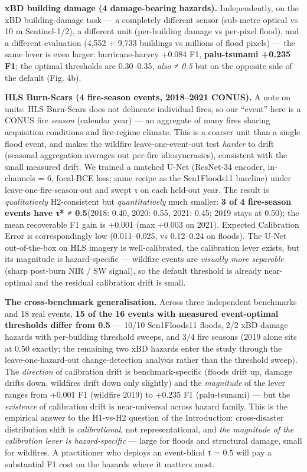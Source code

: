 \textbf{xBD building damage (4 damage-bearing hazards).} Independently, on the
xBD building-damage task --- a completely different sensor (sub-metre optical
vs 10 m Sentinel-1/2), a different unit (per-building damage vs per-pixel
flood), and a different evaluation (4,552 + 9,733 buildings vs millions of
flood pixels) --- the same lever is even larger: hurricane-harvey +0.084 F1,
\textbf{palu-tsunami +0.235 F1}; the optimal thresholds are 0.30--0.35, \emph{also
≠ 0.5} but on the opposite side of the default (Fig. 4b).

\textbf{HLS Burn-Scars (4 fire-season events, 2018--2021 CONUS).} A note on
units: HLS Burn-Scars does not delineate individual fires, so our
``event'' here is a CONUS fire \emph{season} (calendar year) --- an aggregate of
many fires sharing acquisition conditions and fire-regime climate. This
is a coarser unit than a single flood event, and makes the wildfire
leave-one-event-out test \emph{harder} to drift (seasonal aggregation
averages out per-fire idiosyncrasies), consistent with the small
measured drift. We trained a
matched U-Net (ResNet-34 encoder, in-channels = 6, focal-BCE loss; same
recipe as the Sen1Floods11 baseline) under leave-one-fire-season-out and
swept τ on each held-out year. The result is \emph{qualitatively} H2-consistent
but \emph{quantitatively} much smaller: \textbf{3 of 4 fire-season events have
τ* ≠ 0.5}(2018: 0.40, 2020: 0.55, 2021: 0.45; 2019 stays at 0.50);
the mean recoverable F1 gain is +0.001 (max +0.003 on 2021). Expected
Calibration Error is correspondingly low (0.011--0.025, vs 0.12--0.24 on
floods). The U-Net out-of-the-box on HLS imagery is well-calibrated, the
calibration lever exists, but its magnitude is hazard-specific --- wildfire
events are \emph{visually more separable} (sharp post-burn NIR / SW signal),
so the default threshold is already near-optimal and the residual
calibration drift is small.

\textbf{The cross-benchmark generalisation.} Across three independent
benchmarks and 18 real events, \textbf{15 of the 16 events with measured
event-optimal thresholds differ from 0.5} --- 10/10 Sen1Floods11 floods,
2/2 xBD damage hazards with per-building threshold sweeps, and 3/4 fire
seasons (2019 alone sits at 0.50 exactly; the remaining two xBD hazards
enter the study through the leave-one-hazard-out change-detection
analysis rather than the threshold sweep).
The \emph{direction} of calibration drift is benchmark-specific (floods drift
up, damage drifts down, wildfires drift down only slightly) and the
\emph{magnitude} of the lever ranges from +0.001 F1 (wildfire 2019) to
+0.235 F1 (palu-tsunami) --- but the \emph{existence} of calibration drift is
near-universal across hazard family. This is the empirical answer to
the H1-vs-H2 question of the Introduction: cross-disaster distribution
shift is \emph{calibrational}, not representational, and \emph{the magnitude of
the calibration lever is hazard-specific} --- large for floods and
structural damage, small for wildfires. A practitioner who deploys an
event-blind τ = 0.5 will pay a substantial F1 cost on the hazards
where it matters most.

